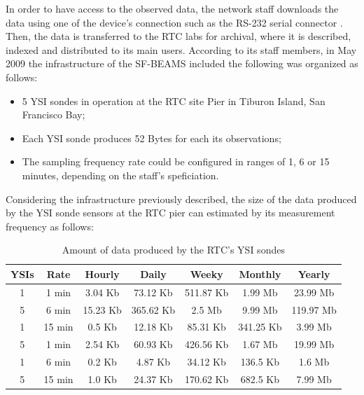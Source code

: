In order to have access to the observed data, the network staff downloads
the data using one of the device's connection such as the RS-232 serial
connector \cite{rs232}. Then, the data is transferred to the RTC labs for
archival, where it is described, indexed and distributed to its main users.
According to its staff members, in May 2009 the infrastructure of the SF-BEAMS
included the following was organized as follows:

\begin{itemize}
  \item 5 YSI sondes in operation at the RTC site Pier in Tiburon Island, San
  Francisco Bay;
  \item Each YSI sonde produces 52 Bytes for each its observations;
  \item The sampling frequency rate could be configured in ranges of 1, 6 or
  15 minutes, depending on the staff's speficiation. 
\end{itemize}

Considering the infrastructure previously described, the size of the data
produced by the YSI sonde sensors at the RTC pier can estimated by its
measurement frequency as follows:

\begin{table}
    \label{tab:ysi-data-distribution}
    \caption{Amount of data produced by the RTC's YSI sondes}
        \begin{center}
        \begin{tabular}{|c|c|c|c|c|c|c|}\hline 
        \textbf{YSIs} & \textbf{Rate} & \textbf{Hourly} & \textbf{Daily} &
        \textbf{Weeky} & \textbf{Monthly} & \textbf{Yearly}\\\hline 
        1 & 1 min & 3.04 Kb & 73.12 Kb & 511.87 Kb & 1.99 Mb & 23.99 Mb\\\hline 
        5 & 6 min & 15.23 Kb & 365.62 Kb & 2.5 Mb & 9.99 Mb & 119.97 Mb\\\hline 
        1 & 15 min & 0.5 Kb & 12.18 Kb & 85.31 Kb & 341.25 Kb & 3.99 Mb\\\hline 
        5 & 1 min & 2.54 Kb & 60.93 Kb & 426.56 Kb & 1.67 Mb & 19.99 Mb\\\hline
        1 & 6 min & 0.2 Kb & 4.87 Kb & 34.12 Kb & 136.5 Kb & 1.6 Mb\\\hline 
        5 & 15 min & 1.0 Kb & 24.37 Kb & 170.62 Kb & 682.5 Kb & 7.99 Mb\\\hline
        \end{tabular}
        \end{center}
\end{table}

